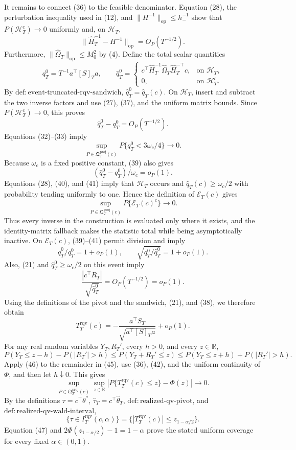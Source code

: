 It remains to connect (36) to the feasible denominator. Equation (28), the perturbation inequality used in (12), and \(\|H^{-1}\|_{\mathrm{op}}\le h_-^{-1}\) show that \(P(\mathcal H_T^c)\to0\) uniformly and, on \(\mathcal H_T\),
\[
 \|\widehat H_T^{-1}-H^{-1}\|_{\mathrm{op}}=O_P(T^{-1/2}).
 \tag{37}
\]
Furthermore, \(\|\widehat\Omega_T\|_{\mathrm{op}}\le M_0^2\) by (4). Define the total scalar quantities
\[
 q_T^0=T^{-1}a^\top[S]_Ta,
 \qquad
 \widehat q_T^0=
 \begin{cases}
 c^\top\widehat H_T^{-1}\widehat\Omega_T\widehat H_T^{-\top}c,
 &\text{on }\mathcal H_T,\\
 0,&\text{on }\mathcal H_T^c.
 \end{cases}
 \tag{38}
\]
By \(\mathrm{def:event\text{-}truncated\text{-}rqv\text{-}sandwich}\), \(\widehat q_T^0=\widehat q_T(c)\). On \(\mathcal H_T\), insert and subtract the two inverse factors and use (27), (37), and the uniform matrix bounds. Since \(P(\mathcal H_T^c)\to0\), this proves
\[
 \widehat q_T^0-q_T^0=O_P(T^{-1/2}).
 \tag{39}
\]
Equations (32)--(33) imply
\[
 \sup_{P\in\mathfrak Q_T^{\mathrm{proj}}(c)}P\{q_T^0<3\omega_c/4\}
 \longrightarrow0.
 \tag{40}
\]
Because \(\omega_c\) is a fixed positive constant, (39) also gives
\[
 (\widehat q_T^0-q_T^0)/\omega_c=o_P(1).
 \tag{41}
\]
Equations (28), (40), and (41) imply that \(\mathcal H_T\) occurs and \(\widehat q_T(c)\ge\omega_c/2\) with probability tending uniformly to one. Hence the definition of \(\mathcal E_T(c)\) gives
\[
 \sup_{P\in\mathfrak Q_T^{\mathrm{proj}}(c)}P\{\mathcal E_T(c)^c\}
 \longrightarrow0.
 \tag{42}
\]
Thus every inverse in the construction is evaluated only where it exists, and the identity-matrix fallback makes the statistic total while being asymptotically inactive. On \(\mathcal E_T(c)\), (39)--(41) permit division and imply
\[
 \widehat q_T^0/q_T^0=1+o_P(1),
 \qquad \sqrt{q_T^0/\widehat q_T^0}=1+o_P(1).
 \tag{43}
\]
Also, (21) and \(\widehat q_T^0\ge\omega_c/2\) on this event imply
\[
 \frac{|c^\top R_T|}{\sqrt{\widehat q_T^0}}=O_P(T^{-1/2})=o_P(1).
 \tag{44}
\]
Using the definitions of the pivot and the sandwich, (21), and (38), we therefore obtain
\[
 T_T^{\mathrm{rqv}}(c)
 =-\frac{a^\top S_T}{\sqrt{a^\top[S]_Ta}}+o_P(1).
 \tag{45}
\]
For any real random variables \(Y_T,R_T'\), every \(h>0\), and every \(z\in\mathbb R\),
\[
 P(Y_T\le z-h)-P(|R_T'|>h)
 \le P(Y_T+R_T'\le z)
 \le P(Y_T\le z+h)+P(|R_T'|>h).
 \tag{46}
\]
Apply (46) to the remainder in (45), use (36), (42), and the uniform continuity of \(\Phi\), and then let \(h\downarrow0\). This gives
\[
 \sup_{P\in\mathfrak Q_T^{\mathrm{proj}}(c)}\sup_{z\in\mathbb R}
 \left|P\{T_T^{\mathrm{rqv}}(c)\le z\}-\Phi(z)\right|
 \longrightarrow0.
 \tag{47}
\]
By the definitions \(\tau=c^\top\theta^*\), \(\widehat\tau_T=c^\top\widehat\theta_T\), \(\mathrm{def:realized\text{-}qv\text{-}pivot}\), and \(\mathrm{def:realized\text{-}qv\text{-}wald\text{-}interval}\),
\[
 \{\tau\in I_T^{\mathrm{rqv}}(c,\alpha)\}
 =\{|T_T^{\mathrm{rqv}}(c)|\le z_{1-\alpha/2}\}.
 \tag{48}
\]
Equation (47) and \(2\Phi(z_{1-\alpha/2})-1=1-\alpha\) prove the stated uniform coverage for every fixed \(\alpha\in(0,1)\).

